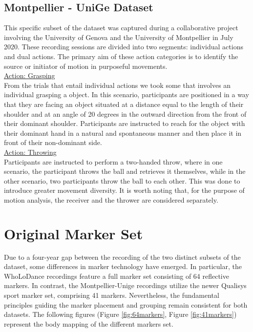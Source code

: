 \subsection{Montpellier - UniGe Dataset}
This specific subset of the dataset was captured during a collaborative project involving the University of Genova and the University of Montpellier in July 2020. 
These recording sessions are divided into two segments: individual actions and dual actions. 
The primary aim of these action categories is to identify the source or initiator of motion in purposeful movements.\\
\underline{Action: Grasping}\\
From the trials that entail individual actions we took some that involves an individual grasping a object. 
In this scenario, participants are positioned in a way that they are facing an object situated at a distance equal to the length 
of their shoulder and at an angle of 20 degrees in the outward direction from the front of their dominant shoulder. 
Participants are instructed to reach for the object with their dominant hand in a natural and spontaneous manner and then place it in front of their non-dominant side.\\
\underline{Action: Throwing}\\
Participants are instructed to perform a two-handed throw, where in one scenario, 
the participant throws the ball and retrieves it themselves, while in the other scenario, two participants throw the ball to each other. 
This was done to introduce greater movement diversity.
It is worth noting that, for the purpose of motion analysis, the receiver and the thrower are considered separately.

\section{Original Marker Set}
\label{sec:orig_markers}
Due to a four-year gap between the recording of the two distinct subsets of the dataset, 
some differences in marker technology have emerged. 
In particular, the WhoLoDance recordings feature a full marker set consisting of 64 reflective markers. 
In contrast, the Montpellier-Unige recordings utilize the newer Qualisys sport marker set, comprising 41 markers. 
Nevertheless, the fundamental principles guiding the marker placement and grouping remain consistent for both datasets. 
The following figures (Figure \ref{fig:64markers}, Figure \ref{fig:41markers}) represent the body mapping of the different markers set. 

